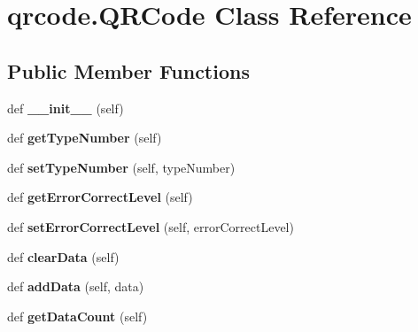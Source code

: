 \hypertarget{classqrcode_1_1_q_r_code}{}\section{qrcode.\+Q\+R\+Code Class Reference}
\label{classqrcode_1_1_q_r_code}
\subsection*{Public Member Functions}
\begin{DoxyCompactItemize}
\item 
\mbox{\label{classqrcode_1_1_q_r_code_ad17fd29a5ba8cfa05bf3ed84a4af40c4}} 
def {\bfseries \+\_\+\+\_\+init\+\_\+\+\_\+} (self)
\item 
\mbox{\label{classqrcode_1_1_q_r_code_a8f57e215e85279c0c91f465a73225d7b}} 
def {\bfseries get\+Type\+Number} (self)
\item 
\mbox{\label{classqrcode_1_1_q_r_code_a8a483ba747e561ffdc3c550d42477eeb}} 
def {\bfseries set\+Type\+Number} (self, type\+Number)
\item 
\mbox{\label{classqrcode_1_1_q_r_code_a36d58c0a86d6e320236d331925e521a7}} 
def {\bfseries get\+Error\+Correct\+Level} (self)
\item 
\mbox{\label{classqrcode_1_1_q_r_code_ae249056fc252b8be707d3086daeea626}} 
def {\bfseries set\+Error\+Correct\+Level} (self, error\+Correct\+Level)
\item 
\mbox{\label{classqrcode_1_1_q_r_code_a3fb5424c67031a641b2c58c99361576a}} 
def {\bfseries clear\+Data} (self)
\item 
\mbox{\label{classqrcode_1_1_q_r_code_a1558df171a10d7247fb0b97cfa562ef0}} 
def {\bfseries add\+Data} (self, data)
\item 
\mbox{\label{classqrcode_1_1_q_r_code_a0a96903d77d54523bd8cbd9da7b6c491}} 
def {\bfseries get\+Data\+Count} (self)
\item 
\mbox{\label{classqrcode_1_1_q_r_code_a27dbc723bbbdf43a76d88581caceff67}} 

\end{DoxyCompactItemize}
